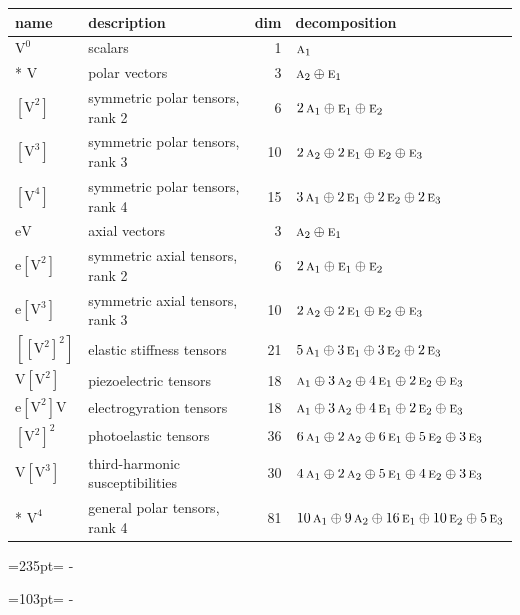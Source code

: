 \documentclass[10pt,a4paper]{article}
\newcommand{\needspace}[1]{\par\penalty-100\begingroup\dimen0=#1\relax\dimen2=\pagegoal
  \advance\dimen2-\pagetotal\ifdim\dimen0>\dimen2\relax\ifdim\dimen2>0pt\vfil\break\fi\fi
  \endgroup}
\numberwithin{equation}{section}
\newcommand{\irr}[1]{\text{\normalfont\scshape #1}}
\newcommand{\jahn}[1]{\mathrm{#1}}
\newlength{\fillwidth}\newlength{\cellwidth}\newlength{\colwidth}
\begin{document}
{\begin{longtable}{@{}llr>{\RaggedRight\arraybackslash}p{\fillwidth}@{}}
name & description & dim & decomposition\\\midrule\endhead
\bottomrule\endfoot\endlastfoot
$\jahn{V^{0}}$ & scalars & 1 & $\irr{a}_{1}$\\*
$\jahn{V}$ & polar vectors & 3 & $\irr{a}_{2} \oplus\allowbreak \irr{e}_{1}$\\
$\jahn{[V^{2}]}$ & symmetric polar tensors, rank 2 & 6 & $2\,\irr{a}_{1} \oplus\allowbreak \irr{e}_{1} \oplus\allowbreak \irr{e}_{2}$\\
$\jahn{[V^{3}]}$ & symmetric polar tensors, rank 3 & 10 & $2\,\irr{a}_{2} \oplus\allowbreak 2\,\irr{e}_{1} \oplus\allowbreak \irr{e}_{2} \oplus\allowbreak \irr{e}_{3}$\\
$\jahn{[V^{4}]}$ & symmetric polar tensors, rank 4 & 15 & $3\,\irr{a}_{1} \oplus\allowbreak 2\,\irr{e}_{1} \oplus\allowbreak 2\,\irr{e}_{2} \oplus\allowbreak 2\,\irr{e}_{3}$\\
$\jahn{eV}$ & axial vectors & 3 & $\irr{a}_{2} \oplus\allowbreak \irr{e}_{1}$\\
$\jahn{e[V^{2}]}$ & symmetric axial tensors, rank 2 & 6 & $2\,\irr{a}_{1} \oplus\allowbreak \irr{e}_{1} \oplus\allowbreak \irr{e}_{2}$\\
$\jahn{e[V^{3}]}$ & symmetric axial tensors, rank 3 & 10 & $2\,\irr{a}_{2} \oplus\allowbreak 2\,\irr{e}_{1} \oplus\allowbreak \irr{e}_{2} \oplus\allowbreak \irr{e}_{3}$\\
$\jahn{[[V^{2}]^{2}]}$ & elastic stiffness tensors & 21 & $5\,\irr{a}_{1} \oplus\allowbreak 3\,\irr{e}_{1} \oplus\allowbreak 3\,\irr{e}_{2} \oplus\allowbreak 2\,\irr{e}_{3}$\\
$\jahn{V[V^{2}]}$ & piezoelectric tensors & 18 & $\irr{a}_{1} \oplus\allowbreak 3\,\irr{a}_{2} \oplus\allowbreak 4\,\irr{e}_{1} \oplus\allowbreak 2\,\irr{e}_{2} \oplus\allowbreak \irr{e}_{3}$\\
$\jahn{e[V^{2}]V}$ & electrogyration tensors & 18 & $\irr{a}_{1} \oplus\allowbreak 3\,\irr{a}_{2} \oplus\allowbreak 4\,\irr{e}_{1} \oplus\allowbreak 2\,\irr{e}_{2} \oplus\allowbreak \irr{e}_{3}$\\
$\jahn{[V^{2}]^{2}}$ & photoelastic tensors & 36 & $6\,\irr{a}_{1} \oplus\allowbreak 2\,\irr{a}_{2} \oplus\allowbreak 6\,\irr{e}_{1} \oplus\allowbreak 5\,\irr{e}_{2} \oplus\allowbreak 3\,\irr{e}_{3}$\\
$\jahn{V[V^{3}]}$ & third-harmonic susceptibilities & 30 & $4\,\irr{a}_{1} \oplus\allowbreak 2\,\irr{a}_{2} \oplus\allowbreak 5\,\irr{e}_{1} \oplus\allowbreak 4\,\irr{e}_{2} \oplus\allowbreak 3\,\irr{e}_{3}$\\*
$\jahn{V^{4}}$ & general polar tensors, rank 4 & 81 & $10\,\irr{a}_{1} \oplus\allowbreak 9\,\irr{a}_{2} \oplus\allowbreak 16\,\irr{e}_{1} \oplus\allowbreak 10\,\irr{e}_{2} \oplus\allowbreak 5\,\irr{e}_{3}$\\
\bottomrule\end{longtable}}
\needspace{235pt}
\needspace{103pt}
\end{document}
